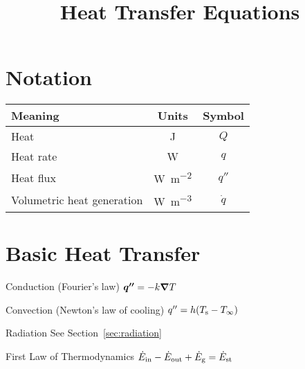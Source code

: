 \documentclass{article}
\title{Heat Transfer Equations}
\begin{document}


\section{Notation}
\begin{tabu}{lcc}
  \toprule
  Meaning & Units & Symbol \\
  \midrule
  Heat & \si{\joule} & $Q$ \\
  Heat rate & \si{\watt} & $q$ \\
  Heat flux & \si{\watt\per\square\meter} & $q''$ \\
  Volumetric heat generation & \si{\watt\per\cubic\meter} & $\dot q$ \\
  \bottomrule
\end{tabu}

\section{Basic Heat Transfer}

\begin{description*}
\item[Conduction (Fourier's law)]
  \(\bm{q''} = -k \bm{\nabla} T\)
\item[Convection (Newton's law of cooling)]
  \(q'' = h(T_{\mathrm{s}}-T_\infty)\)
\item[Radiation] See Section~\ref{sec:radiation}
\item[First Law of Thermodynamics]
  \(\dot{E}_{\mathrm{in}}-\dot{E}_{\mathrm{out}}+\dot{E}_{\mathrm{g}} = \dot{E}_{\mathrm{st}}\)
\end{description*}
\end{document}
